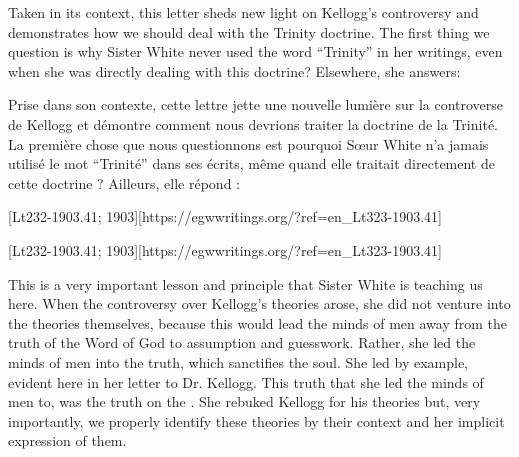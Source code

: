 Taken in its context, this letter sheds new light on Kellogg’s controversy and demonstrates how we should deal with the Trinity doctrine. The first thing we question is why Sister White never used the word “Trinity” in her writings, even when she was directly dealing with this doctrine? Elsewhere, she answers:


Prise dans son contexte, cette lettre jette une nouvelle lumière sur la controverse de Kellogg et démontre comment nous devrions traiter la doctrine de la Trinité. La première chose que nous questionnons est pourquoi Sœur White n'a jamais utilisé le mot “Trinité” dans ses écrits, même quand elle traitait directement de cette doctrine ? Ailleurs, elle répond :


[Lt232-1903.41; 1903][https://egwwritings.org/?ref=en\_Lt323-1903.41]


[Lt232-1903.41; 1903][https://egwwritings.org/?ref=en\_Lt323-1903.41]


This is a very important lesson and principle that Sister White is teaching us here. When the controversy over Kellogg’s theories arose, she did not venture into the theories themselves, because this would lead the minds of men away from the truth of the Word of God to assumption and guesswork. Rather, she led the minds of men into the truth, which sanctifies the soul. She led by example, evident here in her letter to Dr. Kellogg. This truth that she led the minds of men to, was the truth on the . She rebuked Kellogg for his theories but, very importantly, we properly identify these theories by their context and her implicit expression of them.


